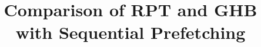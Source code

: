 \documentclass[journal]{IEEEtran}
\begin{document}
\title{Comparison of RPT and GHB with Sequential Prefetching}



\maketitle










%
%




\end{document}
